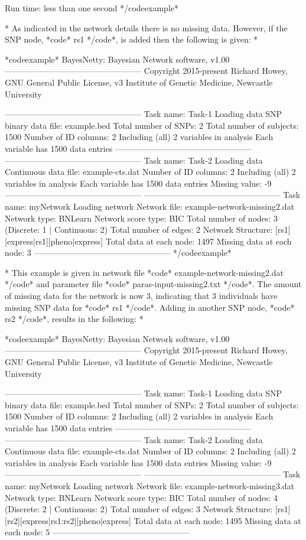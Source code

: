 Run time: less than one second */codeexample*

* As indicated in the network details there is no missing data. However, if the SNP node, *code* rs1 */code*, is added then the following is given: *


*codeexample* BayesNetty: Bayesian Network software, v1.00 -------------------------------------------------- Copyright 2015-present Richard Howey, GNU General Public License, v3 Institute of Genetic Medicine, Newcastle University

-------------------------------------------------- Task name: Task-1 Loading data SNP binary data file: example.bed Total number of SNPs: 2 Total number of subjects: 1500 Number of ID columns: 2 Including (all) 2 variables in analysis Each variable has 1500 data entries -------------------------------------------------- -------------------------------------------------- Task name: Task-2 Loading data Continuous data file: example-cts.dat Number of ID columns: 2 Including (all) 2 variables in analysis Each variable has 1500 data entries Missing value: -9 -------------------------------------------------- -------------------------------------------------- Task name: myNetwork Loading network Network file: example-network-missing2.dat Network type: BNLearn Network score type: BIC Total number of nodes: 3 (Discrete: 1 | Continuous: 2) Total number of edges: 2 Network Structure: [rs1][express|rs1][pheno|express] Total data at each node: 1497 Missing data at each node: 3 -------------------------------------------------- */codeexample*

* This example is given in network file *code* example-network-missing2.dat */code* and parameter file *code* paras-input-missing2.txt */code*. The amount of missing data for the network is now 3, indicating that 3 individuals have missing SNP data for *code* rs1 */code*. Adding in another SNP node, *code* rs2 */code*, results in the following: *

*codeexample* BayesNetty: Bayesian Network software, v1.00 -------------------------------------------------- Copyright 2015-present Richard Howey, GNU General Public License, v3 Institute of Genetic Medicine, Newcastle University

-------------------------------------------------- Task name: Task-1 Loading data SNP binary data file: example.bed Total number of SNPs: 2 Total number of subjects: 1500 Number of ID columns: 2 Including (all) 2 variables in analysis Each variable has 1500 data entries -------------------------------------------------- -------------------------------------------------- Task name: Task-2 Loading data Continuous data file: example-cts.dat Number of ID columns: 2 Including (all) 2 variables in analysis Each variable has 1500 data entries Missing value: -9 -------------------------------------------------- -------------------------------------------------- Task name: myNetwork Loading network Network file: example-network-missing3.dat Network type: BNLearn Network score type: BIC Total number of nodes: 4 (Discrete: 2 | Continuous: 2) Total number of edges: 3 Network Structure: [rs1][rs2][express|rs1:rs2][pheno|express] Total data at each node: 1495 Missing data at each node: 5 --------------------------------------------------

